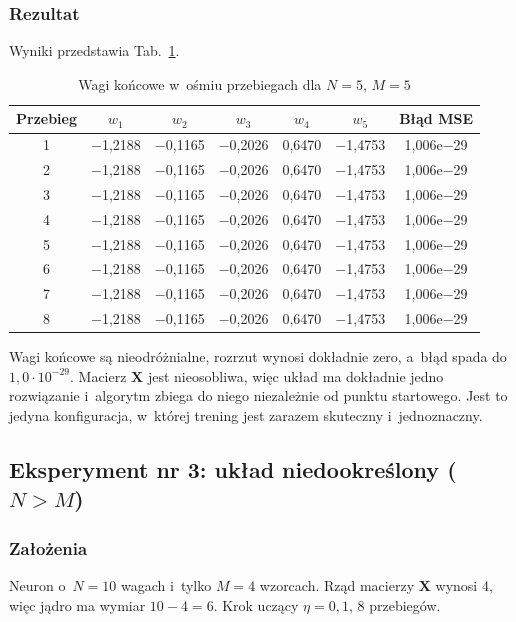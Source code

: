 \documentclass[12pt]{article}
\begin{document}
\subsubsection{Rezultat}
Wyniki przedstawia Tab.~\ref{tab:nm2}.

\begin{table}[h]
\centering
\caption{Wagi końcowe w~ośmiu przebiegach dla $N=5$, $M=5$}
\label{tab:nm2}
\small
\begin{tabular}{ccccccc}
\toprule
\textbf{Przebieg} & $w_1$ & $w_2$ & $w_3$ & $w_4$ & $w_5$ & \textbf{Błąd MSE} \\
\midrule
1 & $-$1,2188 & $-$0,1165 & $-$0,2026 & 0,6470 & $-$1,4753 & 1,006e$-$29 \\
2 & $-$1,2188 & $-$0,1165 & $-$0,2026 & 0,6470 & $-$1,4753 & 1,006e$-$29 \\
3 & $-$1,2188 & $-$0,1165 & $-$0,2026 & 0,6470 & $-$1,4753 & 1,006e$-$29 \\
4 & $-$1,2188 & $-$0,1165 & $-$0,2026 & 0,6470 & $-$1,4753 & 1,006e$-$29 \\
5 & $-$1,2188 & $-$0,1165 & $-$0,2026 & 0,6470 & $-$1,4753 & 1,006e$-$29 \\
6 & $-$1,2188 & $-$0,1165 & $-$0,2026 & 0,6470 & $-$1,4753 & 1,006e$-$29 \\
7 & $-$1,2188 & $-$0,1165 & $-$0,2026 & 0,6470 & $-$1,4753 & 1,006e$-$29 \\
8 & $-$1,2188 & $-$0,1165 & $-$0,2026 & 0,6470 & $-$1,4753 & 1,006e$-$29 \\
\bottomrule
\end{tabular}
\end{table}

Wagi końcowe są nieodróżnialne, rozrzut wynosi dokładnie zero, a~błąd spada do
$1{,}0\cdot10^{-29}$. Macierz $\mathbf{X}$ jest nieosobliwa, więc układ ma dokładnie
jedno rozwiązanie i~algorytm zbiega do niego niezależnie od punktu startowego. Jest
to jedyna konfiguracja, w~której trening jest zarazem skuteczny i~jednoznaczny.

\subsection{Eksperyment nr 3: układ niedookreślony \mbox{($N > M$)}}

\subsubsection{Założenia}
Neuron o~$N=10$ wagach i~tylko $M=4$ wzorcach. Rząd macierzy $\mathbf{X}$ wynosi $4$,
więc jądro ma wymiar $10-4=6$. Krok uczący $\eta = 0{,}1$, 8 przebiegów.
\end{document}
